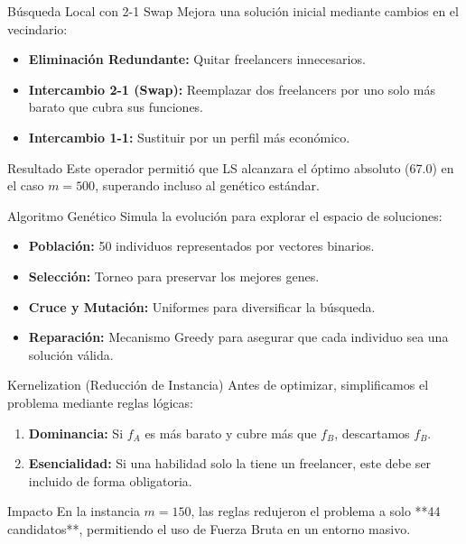 \documentclass[10pt]{beamer}
\begin{document}
\begin{frame}{Búsqueda Local con 2-1 Swap}
    Mejora una solución inicial mediante cambios en el vecindario:
    \begin{itemize}
        \item \textbf{Eliminación Redundante:} Quitar freelancers innecesarios.
        \item \textbf{Intercambio 2-1 (Swap):} Reemplazar dos freelancers por uno solo más barato que cubra sus funciones.
        \item \textbf{Intercambio 1-1:} Sustituir por un perfil más económico.
    \end{itemize}
    \begin{exampleblock}{Resultado}
        Este operador permitió que LS alcanzara el óptimo absoluto (67.0) en el caso $m=500$, superando incluso al genético estándar.
    \end{exampleblock}
\end{frame}

\begin{frame}{Algoritmo Genético}
    Simula la evolución para explorar el espacio de soluciones:
    \begin{itemize}
        \item \textbf{Población:} 50 individuos representados por vectores binarios.
        \item \textbf{Selección:} Torneo para preservar los mejores genes.
        \item \textbf{Cruce y Mutación:} Uniformes para diversificar la búsqueda.
        \item \textbf{Reparación:} Mecanismo Greedy para asegurar que cada individuo sea una solución válida.
    \end{itemize}
\end{frame}

\begin{frame}{Kernelization (Reducción de Instancia)}
    Antes de optimizar, simplificamos el problema mediante reglas lógicas:
    \begin{enumerate}
        \item \textbf{Dominancia:} Si $f_A$ es más barato y cubre más que $f_B$, descartamos $f_B$.
        \item \textbf{Esencialidad:} Si una habilidad solo la tiene un freelancer, este debe ser incluido de forma obligatoria.
    \end{enumerate}
    \begin{alertblock}{Impacto}
        En la instancia $m=150$, las reglas redujeron el problema a solo **44 candidatos**, permitiendo el uso de Fuerza Bruta en un entorno masivo.
    \end{alertblock}
\end{frame}
\end{document}

